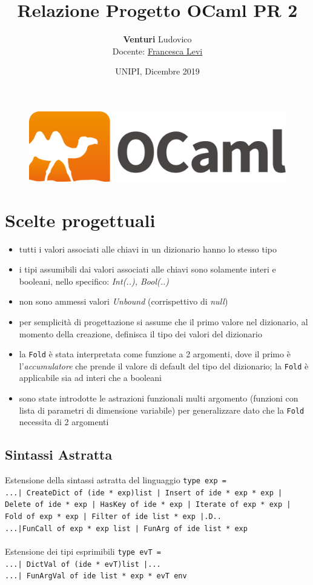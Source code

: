 \documentclass[10pt, a4paper]{article}
\title{\textbf{Relazione Progetto OCaml PR 2}}
\author{\textbf{Venturi} Ludovico\\Docente: \href{http://pages.di.unipi.it/levi/}{Francesca Levi}}
\date{UNIPI, Dicembre 2019}
\begin{document}
\maketitle
\tableofcontents
\vfill
\begin{figure}[h]
	\centering
	\includegraphics[scale=0.3]{ocaml_logo}
	\label{fig:0}
\end{figure}

\clearpage

\section{Scelte progettuali}
\begin{itemize}
\item tutti i valori associati alle chiavi in un dizionario hanno lo stesso tipo
\item i tipi assumibili dai valori associati alle chiavi sono solamente interi e booleani, nello specifico: \textit{Int(..), Bool(..)}
\item non sono ammessi valori \textit{Unbound} (corrispettivo di \textit{null})
\item per semplicità di progettazione si assume che il primo valore nel dizionario, al momento della creazione, definisca il tipo dei valori del dizionario
\item la \texttt{Fold} è stata interpretata come funzione a 2 argomenti, dove il primo è l'\textit{accumulatore} che prende il valore di default del tipo del dizionario; la \texttt{Fold} è applicabile sia ad interi che a booleani
\item sono state introdotte le astrazioni funzionali multi argomento (funzioni con lista di parametri di dimensione variabile) per generalizzare dato che la \texttt{Fold} necessita di 2 argomenti
\end{itemize}
\subsection{Sintassi Astratta}
Estensione della sintassi astratta del linguaggio  \texttt{type exp = }\\
\texttt{...| CreateDict of (ide * exp)list | Insert of ide * exp * exp | Delete of  ide * exp | HasKey of ide * exp | Iterate of exp * exp	|
Fold of exp * exp | Filter of ide list * exp 	|.D..\\
...|FunCall of exp * exp list | FunArg of ide list * exp}\\\\
Estensione dei tipi esprimibili	\texttt{type evT = }\\
\texttt{...| DictVal of (ide * evT)list |...\\...| FunArgVal of ide list * exp * evT env }
\end{document}
